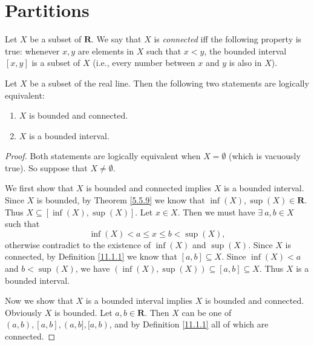 \section{Partitions}\label{sec 11.1}

\begin{definition}\label{11.1.1}
    Let \(X\) be a subset of \(\mathbf{R}\).
    We say that \(X\) is \emph{connected} iff the following property is true:
    whenever \(x, y\) are elements in \(X\) such that \(x < y\), the bounded interval \([x, y]\) is a subset of \(X\)
    (i.e., every number between \(x\) and \(y\) is also in \(X\)).
\end{definition}

\setcounter{theorem}{3}
\begin{lemma}\label{11.1.4}
    Let \(X\) be a subset of the real line.
    Then the following two statements are logically equivalent:
    \begin{enumerate}
        \item \(X\) is bounded and connected.
        \item \(X\) is a bounded interval.
    \end{enumerate}
\end{lemma}

\begin{proof}
    Both statements are logically equivalent when \(X = \emptyset\) (which is vacuously true).
    So suppose that \(X \neq \emptyset\).

    We first show that \(X\) is bounded and connected implies \(X\) is a bounded interval.
    Since \(X\) is bounded, by Theorem \ref{5.5.9} we know that \(\inf(X), \sup(X) \in \mathbf{R}\).
    Thus \(X \subseteq [\inf(X), \sup(X)]\).
    Let \(x \in X\).
    Then we must have \(\exists\ a, b \in X\) such that
    \[
        \inf(X) < a \leq x \leq b < \sup(X),
    \]
    otherwise contradict to the existence of \(\inf(X)\) and \(\sup(X)\).
    Since \(X\) is connected, by Definition \ref{11.1.1} we know that \([a, b] \subseteq X\).
    Since \(\inf(X) < a\) and \(b < \sup(X)\), we have \((\inf(X), \sup(X)) \subseteq [a, b] \subseteq X\).
    Thus \(X\) is a bounded interval.

    Now we show that \(X\) is a bounded interval implies \(X\) is bounded and connected.
    Obviously \(X\) is bounded.
    Let \(a, b \in \mathbf{R}\).
    Then \(X\) can be one of \((a, b), [a, b], (a, b], [a, b)\), and by Definition \ref{11.1.1} all of which are connected.
\end{proof}